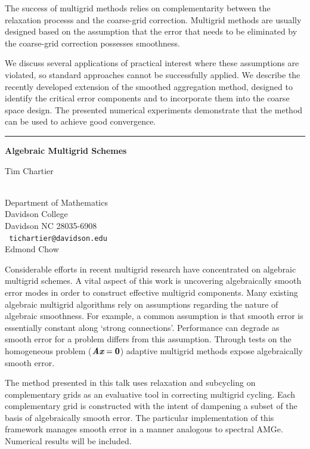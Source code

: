 \documentclass[twosided]{report}
\def\mathbi#1{\textbf{\em #1}}
\begin{document}
The success of multigrid methods relies on complementarity between the
relaxation processs and the coarse-grid correction. Multigrid methods
are usually designed based on the assumption that the error that needs
to be eliminated by the coarse-grid correction possesses smoothness.

We discuss several applications of practical interest where these
assumptions are violated, so standard approaches cannot be successfully
applied. We describe the recently developed extension of the smoothed
aggregation method, designed to identify the critical error components
and to incorporate them into the coarse space design. The presented
numerical experiments demonstrate that the method can be used to
achieve good convergence.

\begin{center}


\rule{6in}{1pt}
\end{center}

\begin{center}
{\large			\label{chartier}
{\bf
Algebraic Multigrid Schemes
}

Tim Chartier} \\
Department of Mathematics
\\
Davidson College
\\
Davidson NC 28035-6908
\\ {\tt
tichartier@davidson.edu
}
\\
Edmond Chow
\end{center}

Considerable efforts in recent multigrid research have concentrated on
algebraic multigrid schemes. A vital aspect of this work is uncovering
algebraically smooth error modes in order to construct effective
multigrid components. Many existing algebraic multigrid algorithms rely
on assumptions regarding the nature of algebraic smoothness. For
example, a common assumption is that smooth error is essentially
constant along `strong connections'. Performance can degrade as smooth
error for a problem differs from this assumption. Through tests on the
homogeneous problem
($\mathbi{Ax} = \mathbf{0}$)
adaptive multigrid methods expose
algebraically smooth error.

The method presented in this talk uses relaxation and subcycling on
complementary grids as an evaluative tool in correcting multigrid
cycling. Each complementary grid is constructed with the intent of
dampening a subset of the basis of algebraically smooth error. The
particular implementation of this framework manages smooth error in a
manner analogous to spectral AMGe. Numerical results will be included.
\end{document}
